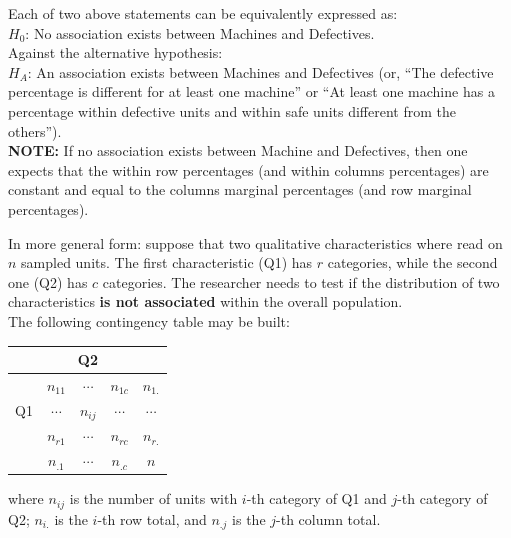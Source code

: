 \begin{frame}
  \vspace*{.25cm}
  Each of two above statements can be equivalently expressed as:\\
  \vspace*{.25cm}
  $ H_0 $: No association exists between Machines and Defectives.\\
  \vspace*{.25cm}
  Against the alternative hypothesis:\\
  \vspace*{.25cm}
  $ H_A $: An association exists between Machines and Defectives (or, ``The defective percentage is different for at least one machine'' or ``At least one machine has a percentage within defective units and within safe units different from the others'').\\
  \vspace*{.25cm}
  \textbf{NOTE:} If no association exists between Machine and Defectives, then one expects that the within row percentages (and within columns percentages) are constant and equal to the columns marginal percentages (and row marginal percentages).
\end{frame}

\begin{frame}
  In more general form: suppose that two qualitative characteristics where read on  $n$ sampled units. The first characteristic (Q1) has $r$ categories, while the second one (Q2) has $c$ categories. The researcher needs to test if the distribution of two characteristics \textbf{is not associated} within the overall population.\\
  The following contingency table may be built:\\
  \begin{table}
    \begin{tabular}{|c|c|c|c|c|}
      \hline
      \multicolumn{1}{|c|}{} & \multicolumn{3}{|c|}{Q2} & \multicolumn{1}{|c|}{}\\ \hline
      & $n_{11}$ & $\cdots$ & $n_{1c}$ & $n_{1.}$ \\ \cline{2-5}
      Q1  & $\cdots$ & $n_{ij}$ & $\cdots$ & $\cdots$ \\ \cline{2-5} 
      & $n_{r1}$ & $\cdots$ & $n_{rc}$ & $n_{r.}$ \\ \hline
      & $n_{.1}$ & $\cdots$ & $n_{.c}$ & $n$ \\ \hline
    \end{tabular}
  \end{table}
  \vspace{-0.15cm}
  where $ n_{ij} $ is the number of units with $ i $-th category of Q1 and $ j $-th category of Q2; $ n_{i.} $ is the $ i $-th row total, and $ n_{.j} $ is the $ j $-th column total.
\end{frame}

